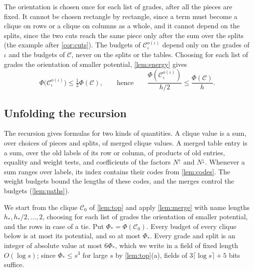 \documentclass[11pt]{article}
\theoremstyle{definition}
\theoremstyle{definition}
\theoremstyle{remark}
\newcommand{\Nup}{N^{\uparrow}}
\newcommand{\Ndown}{N^{\downarrow}}
\begin{document}
The orientation is chosen once for each list of grades, after all the pieces are fixed. It cannot be chosen rectangle by rectangle, since a term must become a clique on rows or a clique on columns as a whole, and it cannot depend on the splits, since the two cuts reach the same piece only after the sum over the splits (the example after \cref{cor:cuts}). The budgets of $\mathcal C^{o(\iota)}_\iota$ depend only on the grades of $\iota$ and the budgets of $\mathcal C$, never on the splits or the tables. Choosing for each list of grades the orientation of smaller potential, \cref{lem:energy} gives
\[
\Phi\bigl(\mathcal C^{o(\iota)}_\iota\bigr)\le\tfrac12\Phi(\mathcal C),\qquad\text{hence}\qquad\frac{\Phi(\mathcal C^{o(\iota)}_\iota)}{h/2}\le\frac{\Phi(\mathcal C)}h.
\]

\subsection{Unfolding the recursion}\label{sec:formula}

The recursion gives formulas for two kinds of quantities. A clique value is a sum, over choices of pieces and splits, of merged clique values. A merged table entry is a sum, over the old labels of its row or column, of products of old entries, equality and weight tests, and coefficients of the factors $\Nup$ and $\Ndown$. Whenever a sum ranges over labels, its index contains their codes from \cref{lem:codes}. The weight budgets bound the lengths of these codes, and the merges control the budgets (\cref{lem:paths}).

We start from the clique $\mathcal C_0$ of \cref{lem:top} and apply \cref{lem:merge} with name lengths $h_*,h_*/2,\dots,2$, choosing for each list of grades the orientation of smaller potential, and the rows in case of a tie. Put $\Phi_*=\Phi(\mathcal C_0)$. Every budget of every clique below is at most its potential, and so at most $\Phi_*$. Every grade and split is an integer of absolute value at most $6\Phi_*$, which we write in a field of fixed length $O(\log s)$; since $\Phi_*\le s^3$ for large $s$ by \cref{lem:top}(a), fields of $3\lceil\log s\rceil+5$ bits suffice.
\end{document}
